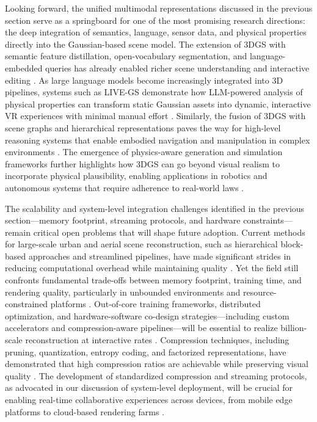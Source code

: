\documentclass[11pt]{article}
\begin{document}
Looking forward, the unified multimodal representations discussed in the previous section serve as a springboard for one of the most promising research directions: the deep integration of semantics, language, sensor data, and physical properties directly into the Gaussian-based scene model. The extension of 3DGS with semantic feature distillation, open-vocabulary segmentation, and language-embedded queries has already enabled richer scene understanding and interactive editing \cite{ref8}. As large language models become increasingly integrated into 3D pipelines, systems such as LIVE-GS demonstrate how LLM-powered analysis of physical properties can transform static Gaussian assets into dynamic, interactive VR experiences with minimal manual effort \cite{ref680}. Similarly, the fusion of 3DGS with scene graphs and hierarchical representations paves the way for high-level reasoning systems that enable embodied navigation and manipulation in complex environments \cite{ref788}. The emergence of physics-aware generation and simulation frameworks further highlights how 3DGS can go beyond visual realism to incorporate physical plausibility, enabling applications in robotics and autonomous systems that require adherence to real-world laws \cite{ref789}.

The scalability and system-level integration challenges identified in the previous section---memory footprint, streaming protocols, and hardware constraints---remain critical open problems that will shape future adoption. Current methods for large-scale urban and aerial scene reconstruction, such as hierarchical block-based approaches and streamlined pipelines, have made significant strides in reducing computational overhead while maintaining quality \cite{ref698,ref790}. Yet the field still confronts fundamental trade-offs between memory footprint, training time, and rendering quality, particularly in unbounded environments and resource-constrained platforms \cite{ref37}. Out-of-core training frameworks, distributed optimization, and hardware-software co-design strategies---including custom accelerators and compression-aware pipelines---will be essential to realize billion-scale reconstruction at interactive rates \cite{ref702}. Compression techniques, including pruning, quantization, entropy coding, and factorized representations, have demonstrated that high compression ratios are achievable while preserving visual quality \cite{ref791}. The development of standardized compression and streaming protocols, as advocated in our discussion of system-level deployment, will be crucial for enabling real-time collaborative experiences across devices, from mobile edge platforms to cloud-based rendering farms \cite{ref5}.
\end{document}
